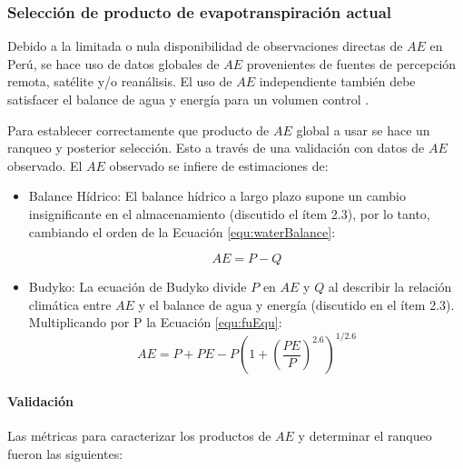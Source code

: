 \documentclass[12pt]{article}
\begin{document}
\clearpage


\subsubsection{Selección de producto de evapotranspiración actual}

Debido a la limitada o nula disponibilidad de observaciones directas de $AE$ en Perú, se hace uso de datos globales de $AE$ provenientes de fuentes de percepción remota, satélite y/o reanálisis. El uso de $AE$ independiente también debe satisfacer el balance de agua y energía para un volumen control \citep{Singh2015}.

Para establecer correctamente que producto de $AE$ global a usar se hace un ranqueo y posterior selección. Esto a través de una validación con datos de $AE$ observado. El $AE$ observado se infiere de estimaciones de:

\begin{itemize}

	\item Balance Hídrico: El balance hídrico a largo plazo supone un cambio insignificante en el almacenamiento (discutido el ítem 2.3), por lo tanto, cambiando el orden de la Ecuación \ref{equ:waterBalance}:
	
	\begin{equation}
    AE = P - Q
    \label{equ:bheq}
    \end{equation}

	\item Budyko: La ecuación de Budyko divide $P$ en $AE$ y $Q$ al describir la relación climática entre $AE$ y el balance de agua y energía (discutido en el ítem 2.3). Multiplicando por P la Ecuación \ref{equ:fuEqu}:
    \begin{equation}
    AE = P + PE - P\left (1 + \left ( \frac{PE}{P} \right )^{2.6}  \right )^{1/2.6}
    \end{equation}
	
\end{itemize}


\paragraph{Validación}\mbox{}

Las métricas para caracterizar los productos de $AE$ y determinar el ranqueo fueron las siguientes:
\end{document}
